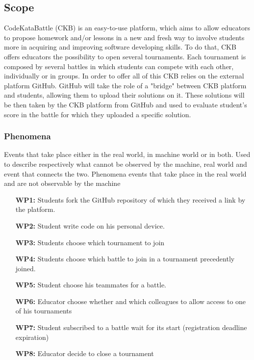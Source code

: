 \documentclass{article}
\newcounter{subsubsubsection}[subsubsection]
\begin{document}
\subsection{Scope}
CodeKataBattle (CKB) is an easy-to-use platform, which aims to allow educators to propose homework and/or lessons in a new and fresh way to involve students more in acquiring and improving software developing skills. To do that, CKB offers educators the possibility to open several tournaments. Each tournament is composed by several battles in which students can compete with each other, individually or in groups.
In order to offer all of this CKB relies on the external platform GitHub. GitHub will take the role of a "bridge" between CKB platform and students, allowing them to upload their solutions on it. These solutions will be then taken by the CKB platform from GitHub and used to evaluate student's score in the battle for which they uploaded a specific solution.
\subsubsection{Phenomena}
Events that take place either in the real world, in machine world or in both. Used to describe respectively what cannot be observed by the machine, real world and event that connects the two.
Phenomena events that take place in the real world and are not observable by the machine
\begin{enumerate}
    \item[\textbf{WP1:}] Students fork the GitHub repository of which they received a link by the platform.
    \item[\textbf{WP2:}] Student write code on his personal device.
    \item[\textbf{WP3:}] Students choose which tournament to join
    \item[\textbf{WP4:}] Students choose which battle to join in a tournament precedently joined.
    \item[\textbf{WP5:}] Student choose his teammates for a battle.
    \item[\textbf{WP6:}] Educator choose whether and which colleagues to allow access to one of his tournaments
    \item[\textbf{WP7:}] Student subscribed to a battle wait for its start (registration deadline expiration)
    \item[\textbf{WP8:}] Educator decide to close a tournament
\end{enumerate}
\end{document}
